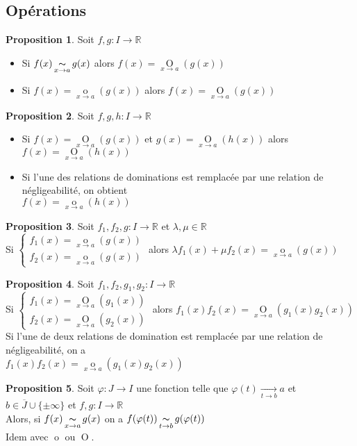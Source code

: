 \documentclass[10pt,a4paper]{article}
\theoremstyle{definition}
\newtheorem{proposition}{Proposition}[section]
\DeclareMathOperator*{\eqv}{\thicksim}
\DeclareMathOperator*{\negl}{o}
\DeclareMathOperator*{\dom}{O}
\begin{document}
\subsection{Opérations}
\begin{proposition}
Soit $f,g: I \to \mathbb{R}$
\begin{itemize}
\item Si $f(x) \eqv\limits_{x \to a} g(x)$ alors $f(x) = \dom\limits_{x \to a}(g(x))$
\item Si $f(x) = \negl\limits_{x \to a}(g(x))$ alors $f(x) = \dom\limits_{x \to a}(g(x))$
\end{itemize}
\end{proposition}
\begin{proposition}
Soit $f,g,h: I \to \mathbb{R}$
\begin{itemize}
\item Si $f(x) = \dom\limits_{x \to a}(g(x))$ et $g(x) = \dom\limits_{x \to a}(h(x))$ alors $f(x) = \dom\limits_{x \to a}(h(x))$
\item Si l'une des relations de dominations est remplacée par une relation de négligeabilité, on obtient \\
$f(x) = \negl\limits_{x \to a}(h(x))$
\end{itemize}
\end{proposition}
\begin{proposition}
Soit $f_1, f_2, g: I \to \mathbb{R}$ et $\lambda, \mu \in \mathbb{R}$ \\
Si $\begin{cases}
f_1(x) = \negl\limits_{x \to a}(g(x)) \\
f_2(x) = \negl\limits_{x \to a}(g(x))
\end{cases}$ alors $\lambda f_1(x) + \mu f_2(x) = \negl\limits_{x \to a}(g(x))$
\end{proposition}
\begin{proposition}
Soit $f_1, f_2, g_1, g_2: I \to \mathbb{R}$ \\
Si $\begin{cases}
f_1(x) = \dom\limits_{x \to a}(g_1(x)) \\
f_2(x) = \dom\limits_{x \to a}(g_2(x))
\end{cases}$ alors $f_1(x) f_2(x) = \dom\limits_{x \to a}(g_1(x) g_2(x))$ \\
Si l'une de deux relations de domination est remplacée par une relation de négligeabilité, on a \\
$f_1(x) f_2(x) = \negl\limits_{x \to a}(g_1(x) g_2(x))$
\end{proposition}
\begin{proposition}
Soit $\varphi: J \to I$ une fonction telle que $\varphi(t) \xrightarrow[t \to b]{} a$ et $b \in \overline{J} \cup \{ \pm\infty \}$ et $f, g: I \to \mathbb{R}$ \\
Alors, si $f(x) \eqv\limits_{x \to a} g(x)$ on a $f(\varphi(t)) \eqv\limits_{t \to b} g(\varphi(t))$ \\
Idem avec $\negl$ ou $\dom$.
\end{proposition}
\end{document}
